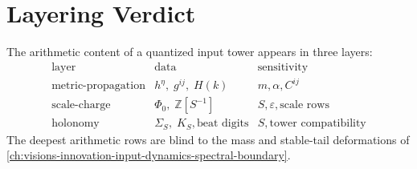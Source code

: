 \section{Layering Verdict}
\label{sec:innovation-input-solenoid-layering-verdict}

\begin{principle}
\label{prin:innovation-input-solenoid-three-arithmetic-layers}
The arithmetic content of a quantized input tower appears in three layers:
$$
\begin{array}{c|c|c}
\text{layer} & \text{data} & \text{sensitivity}\\
\hline
\text{metric-propagation} & h^\eta,\;g^{ij},\;H(k) & m,\alpha,C^{ij}\\
\text{scale-charge} & \Phi_0,\;\mathbb Z[S^{-1}] & S,\varepsilon,\text{scale rows}\\
\text{holonomy} & \Sigma_S,\;K_S,\text{beat digits} & S,\text{tower compatibility}
\end{array}
$$
The deepest arithmetic rows are blind to the mass and stable-tail
deformations of \autoref{ch:visions-innovation-input-dynamics-spectral-boundary}.
\end{principle}
